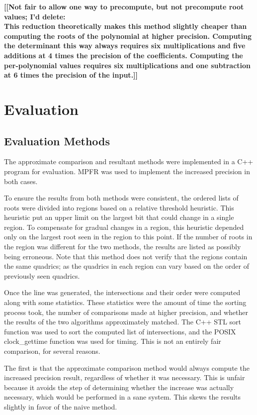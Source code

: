 \documentclass{cccg16}
\def\Jack#1{{\bf [[#1]]}\ignorespaces}
\begin{document}
\Jack{Not fair to allow one way to precompute, but not precompute root values; I'd delete:\\\rm
This reduction theoretically makes this method slightly cheaper than
computing the roots of the polynomial at higher precision.  Computing
the determinant this way always requires six multiplications and five
additions at 4 times the precision of the coefficients.  Computing the
per-polynomial values requires six multiplications and one subtraction
at 6 times the precision of the input.}


\section{Evaluation}
\subsection{Evaluation Methods}
The approximate comparison and resultant methods were implemented in a
C++ program for evaluation.  MPFR was used to implement the increased
precision in both cases.

To ensure the results from both methods were consistent, the ordered
lists of roots were divided into regions based on a relative threshold
heuristic.  This heuristic put an upper limit on the largest bit that
could change in a single region.  To compensate for gradual changes in
a region, this heuristic depended only on the largest root seen in the
region to this point.  If the number of roots in the region was
different for the two methods, the results are listed as possibly
being erroneous.  Note that this method does not verify that the
regions contain the same quadrics; as the quadrics in each region can
vary based on the order of previously seen quadrics.

Once the line was generated, the intersections and their order were
computed along with some statistics.  These statistics were the amount
of time the sorting process took, the number of comparisons made at
higher precision, and whether the results of the two algorithms
approximately matched.  The C++ STL sort function was used to sort the
computed list of intersections, and the POSIX clock\_gettime function
was used for timing.  This is not an entirely fair comparison, for
several reasons.

The first is that the approximate comparison method would always
compute the increased precision result, regardless of whether it was
necessary.  This is unfair because it avoids the step of determining
whether the increase was actually necessary, which would be performed
in a sane system.  This skews the results slightly in favor of the naive
method.
\end{document}
